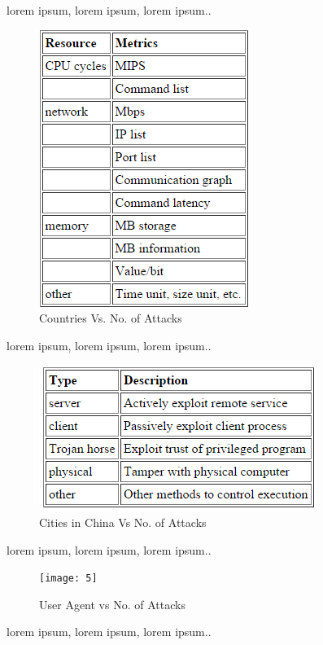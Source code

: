 \documentclass{article}
\begin{document}
lorem ipsum, lorem ipsum, lorem ipsum..
 
\begin{figure}[h]
\caption{Countries Vs. No. of Attacks}
\centering
\includegraphics[width=0.7\linewidth]{1}
\end{figure}

lorem ipsum, lorem ipsum, lorem ipsum..

\begin{figure}[h]
\caption{Cities in China Vs No. of Attacks}
\centering
\includegraphics[width=0.7\linewidth]{2}
\end{figure}

lorem ipsum, lorem ipsum, lorem ipsum..

\begin{figure}[h]
\caption{User Agent vs No. of Attacks}
\centering
\texttt{[image: 5]}
\end{figure}

lorem ipsum, lorem ipsum, lorem ipsum..
\end{document}
